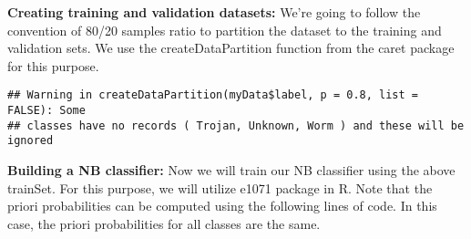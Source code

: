 \documentclass[]{article}
\newenvironment{Shaded}{\begin{snugshade}}{\end{snugshade}}
\newcommand{\CommentTok}[1]{\textcolor[rgb]{0.56,0.35,0.01}{\textit{#1}}}
\newcommand{\DataTypeTok}[1]{\textcolor[rgb]{0.13,0.29,0.53}{#1}}
\newcommand{\DecValTok}[1]{\textcolor[rgb]{0.00,0.00,0.81}{#1}}
\newcommand{\FloatTok}[1]{\textcolor[rgb]{0.00,0.00,0.81}{#1}}
\newcommand{\KeywordTok}[1]{\textcolor[rgb]{0.13,0.29,0.53}{\textbf{#1}}}
\newcommand{\NormalTok}[1]{#1}
\newcommand{\OperatorTok}[1]{\textcolor[rgb]{0.81,0.36,0.00}{\textbf{#1}}}
\newcommand{\OtherTok}[1]{\textcolor[rgb]{0.56,0.35,0.01}{#1}}
\newcommand{\StringTok}[1]{\textcolor[rgb]{0.31,0.60,0.02}{#1}}
\begin{document}
\textbf{Creating training and validation datasets:} We're going to
follow the convention of 80/20 samples ratio to partition the dataset to
the training and validation sets. We use the createDataPartition
function from the caret package for this purpose.

\begin{Shaded}
\end{Shaded}

\begin{verbatim}
## Warning in createDataPartition(myData$label, p = 0.8, list = FALSE): Some
## classes have no records ( Trojan, Unknown, Worm ) and these will be ignored
\end{verbatim}

\begin{Shaded}
\end{Shaded}

\textbf{Building a NB classifier:} Now we will train our NB classiﬁer
using the above trainSet. For this purpose, we will utilize e1071
package in R. Note that the priori probabilities can be computed using
the following lines of code. In this case, the priori probabilities for
all classes are the same.

\begin{Shaded}
\end{Shaded}
\end{document}
